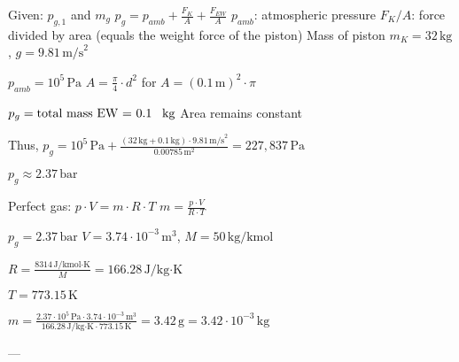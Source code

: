 Given: \( p_{g,1} \) and \( m_{g} \)  
\( p_{g} = p_{amb} + \frac{F_{K}}{A} + \frac{F_{EW}}{A} \)  
\( p_{amb} \): atmospheric pressure  
\( F_{K} / A \): force divided by area (equals the weight force of the piston)  
Mass of piston \( m_{K} = 32 \, \text{kg} \), \( g = 9.81 \, \text{m/s}^2 \)  

\( p_{amb} = 10^5 \, \text{Pa} \)  
\( A = \frac{\pi}{4} \cdot d^2 \) for \( A = (0.1 \, \text{m})^2 \cdot \pi \)  

\( p_{g} = \text{total mass EW = 0.1 \, kg} \)  
Area remains constant  

Thus, \( p_{g} = 10^5 \, \text{Pa} + \frac{(32 \, \text{kg} + 0.1 \, \text{kg}) \cdot 9.81 \, \text{m/s}^2}{0.00785 \, \text{m}^2} = 227,837 \, \text{Pa} \)  

\( p_{g} \approx 2.37 \, \text{bar} \)  

Perfect gas: \( p \cdot V = m \cdot R \cdot T \)  
\( m = \frac{p \cdot V}{R \cdot T} \)  

\( p_{g} = 2.37 \, \text{bar} \)  
\( V = 3.74 \cdot 10^{-3} \, \text{m}^3 \), \( M = 50 \, \text{kg/kmol} \)  

\( R = \frac{8314 \, \text{J/kmol·K}}{M} = 166.28 \, \text{J/kg·K} \)  

\( T = 773.15 \, \text{K} \)  

\( m = \frac{2.37 \cdot 10^5 \, \text{Pa} \cdot 3.74 \cdot 10^{-3} \, \text{m}^3}{166.28 \, \text{J/kg·K} \cdot 773.15 \, \text{K}} = 3.42 \, \text{g} = 3.42 \cdot 10^{-3} \, \text{kg} \)  

---